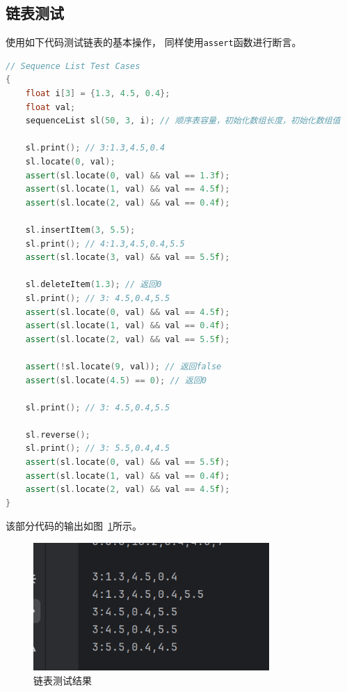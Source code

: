 \documentclass{csexp}
\begin{document}
\subsection{链表测试}

使用如下代码测试链表的基本操作， 同样使用\texttt{assert}函数进行断言。

\begin{lstlisting}[language=C++]
// Sequence List Test Cases
{
    float i[3] = {1.3, 4.5, 0.4};
    float val;
    sequenceList sl(50, 3, i); // 顺序表容量，初始化数组长度，初始化数组值

    sl.print(); // 3:1.3,4.5,0.4
    sl.locate(0, val);
    assert(sl.locate(0, val) && val == 1.3f);
    assert(sl.locate(1, val) && val == 4.5f);
    assert(sl.locate(2, val) && val == 0.4f);

    sl.insertItem(3, 5.5);
    sl.print(); // 4:1.3,4.5,0.4,5.5
    assert(sl.locate(3, val) && val == 5.5f);

    sl.deleteItem(1.3); // 返回0
    sl.print(); // 3: 4.5,0.4,5.5
    assert(sl.locate(0, val) && val == 4.5f);
    assert(sl.locate(1, val) && val == 0.4f);
    assert(sl.locate(2, val) && val == 5.5f);

    assert(!sl.locate(9, val)); // 返回false
    assert(sl.locate(4.5) == 0); // 返回0

    sl.print(); // 3: 4.5,0.4,5.5

    sl.reverse();
    sl.print(); // 3: 5.5,0.4,4.5
    assert(sl.locate(0, val) && val == 5.5f);
    assert(sl.locate(1, val) && val == 0.4f);
    assert(sl.locate(2, val) && val == 4.5f);
}
\end{lstlisting}

该部分代码的输出如图~\ref{fig:link-test}所示。

\begin{figure}[htbp]
    \centering
    \includegraphics[width=0.8\textwidth]{exp1-2.png}
    \caption{链表测试结果}
    \label{fig:link-test}
\end{figure}
\end{document}
